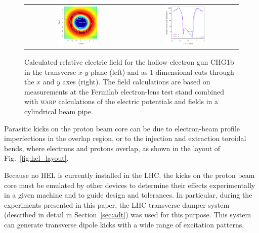 \documentclass[
prstab
,reprint
,linenumbers
,longbibliography
,preprintnumbers
,showkeys
,amsfonts,amssymb,amsmath
,floatfix
]{revtex4-1}
\newcommand{\code}[1]{\textsc{#1}} %
\begin{document}
\begin{figure}
  \begin{tabular}{cc}
    \includegraphics[width=0.4\textwidth]{CHG1b_170512_8p75A_2-4-2p7kG_500V_76mA_hires_Emap} &
    \includegraphics[width=0.4\textwidth]{CHG1b_170512_8p75A_2-4-2p7kG_500V_76mA_hires_Eslice}\\
  \end{tabular}
  \caption{Calculated relative electric field for the hollow electron
    gun CHG1b in the transverse $x$-$y$ plane (left) and as
    1-dimensional cuts through the $x$ and $y$ axes (right). The field
    calculations are based on measurements at the Fermilab
    electron-lens test stand combined with \code{warp} calculations of
    the electric potentials and fields in a cylindrical beam pipe.}
  \label{core:fig:1}
\end{figure}

Parasitic kicks on the proton beam core can be due to electron-beam
profile imperfections in the overlap region, or to the injection and
extraction toroidal bends, where electrons and protons overlap, as
shown in the layout of Fig.~\ref{fig:hel_layout}.

Because no HEL is currently installed in the LHC, the kicks on the
proton beam core must be emulated by other devices to determine their
effects experimentally in a given machine and to guide design and
tolerances. In particular, during the experiments presented in this
paper, the LHC transverse damper system (described in detail in
Section~\ref{sec:adt}) was used for this purpose. This system can
generate transverse dipole kicks with a wide range of excitation
patterns.
\end{document}
